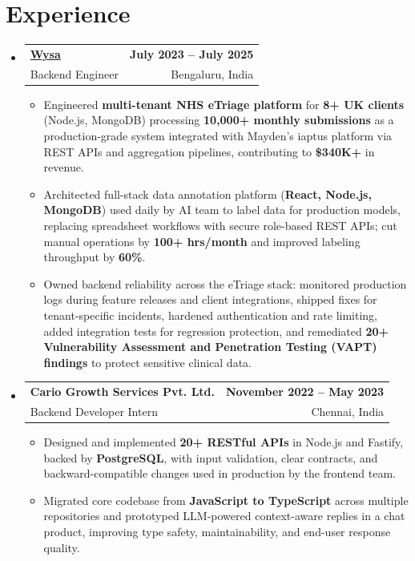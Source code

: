 \documentclass[letterpaper,10pt]{article}
\makeatletter
\newcommand{\resumeItem}[1]{
  \item\small{#1\vspace{-1pt}}
}
\newcommand{\resumeSubheading}[4]{
  \vspace{1pt}\item
    \begin{tabular*}{0.985\textwidth}[t]{l@{\extracolsep{\fill}}r}
      \textbf{#1} & \textbf{\small #2} \\
      {\small\color{ResumeSlate} #3} & {\small\color{ResumeSlate} #4} \\
    \end{tabular*}\vspace{-6pt}
}
\newcommand{\resumeSubHeadingListStart}{\begin{itemize}[leftmargin=0.0in, label={}, itemsep=2pt, topsep=2pt]}
\newcommand{\resumeSubHeadingListEnd}{\end{itemize}}
\newcommand{\resumeItemListStart}{\begin{itemize}[leftmargin=0.18in, itemsep=2pt, topsep=1pt]}
\newcommand{\resumeItemListEnd}{\end{itemize}\vspace{-4pt}}
\makeatother
\begin{document}
\section{Experience}
\resumeSubHeadingListStart
  \resumeSubheading
    {\href{https://www.wysa.io}{Wysa}}{July 2023 -- July 2025}
    {Backend Engineer}{Bengaluru, India}
    \resumeItemListStart
      \resumeItem{Engineered \textbf{multi-tenant NHS eTriage platform} for \textbf{8+ UK clients} (Node.js, MongoDB) processing \textbf{10{,}000+ monthly submissions} as a production-grade system integrated with Mayden's iaptus platform via REST APIs and aggregation pipelines, contributing to \textbf{\$340K+} in revenue.}
      \resumeItem{Architected full-stack data annotation platform (\textbf{React, Node.js, MongoDB}) used daily by AI team to label data for production models, replacing spreadsheet workflows with secure role-based REST APIs; cut manual operations by \textbf{100+ hrs/month} and improved labeling throughput by \textbf{60\%}.}
      \resumeItem{Owned backend reliability across the eTriage stack: monitored production logs during feature releases and client integrations, shipped fixes for tenant-specific incidents, hardened authentication and rate limiting, added integration tests for regression protection, and remediated \textbf{20+ Vulnerability Assessment and Penetration Testing (VAPT) findings} to protect sensitive clinical data.}
    \resumeItemListEnd
  \resumeSubheading
    {Cario Growth Services Pvt. Ltd.}{November 2022 -- May 2023}
    {Backend Developer Intern}{Chennai, India}
    \resumeItemListStart
      \resumeItem{Designed and implemented \textbf{20+ RESTful APIs} in Node.js and Fastify, backed by \textbf{PostgreSQL}, with input validation, clear contracts, and backward-compatible changes used in production by the frontend team.}
      \resumeItem{Migrated core codebase from \textbf{JavaScript to TypeScript} across multiple repositories and prototyped LLM-powered context-aware replies in a chat product, improving type safety, maintainability, and end-user response quality.}
    \resumeItemListEnd
\resumeSubHeadingListEnd
\vspace{-4pt}
\end{document}
